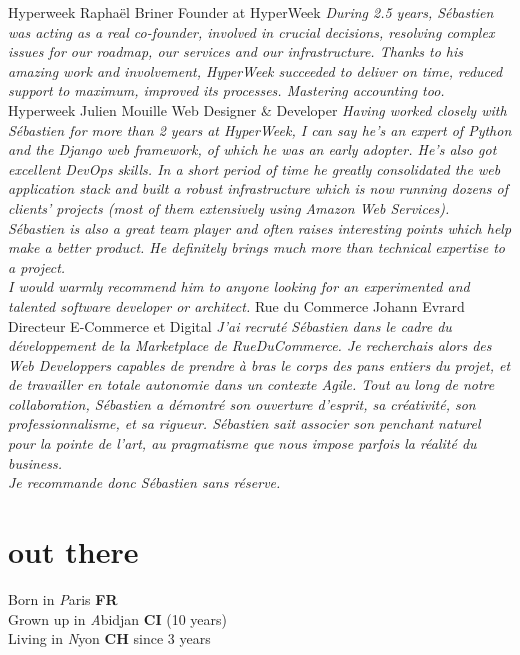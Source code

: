 \documentclass[]{friggeri}
\begin{document}
\begin{entrylist}
  \entry
    {Hyperweek}
    {Raphaël Briner}
    {Founder at HyperWeek}
    {\emph{During 2.5 years, Sébastien was acting as a real co-founder, involved in crucial decisions, resolving complex issues for our roadmap, our services and our infrastructure. Thanks to his amazing work and involvement, HyperWeek succeeded to deliver on time, reduced support to maximum, improved its processes. Mastering accounting too.}}
  \entry
    {Hyperweek}
    {Julien Mouille}
    {Web Designer \& Developer}
    {\emph{Having worked closely with Sébastien for more than 2 years at HyperWeek, I can say he's an expert of Python and the Django web framework, of which he was an early adopter. He's also got excellent DevOps skills. In a short period of time he greatly consolidated the web application stack and built a robust infrastructure which is now running dozens of clients' projects (most of them extensively using Amazon Web Services).\\
    Sébastien is also a great team player and often raises interesting points which help make a better product. He definitely brings much more than technical expertise to a project.\\
    I would warmly recommend him to anyone looking for an experimented and talented software developer or architect.}}
  \entry
    {Rue du Commerce}
    {Johann Evrard}
    {Directeur E-Commerce et Digital}
    {\emph{J'ai recruté Sébastien dans le cadre du développement de la Marketplace de RueDuCommerce. Je recherchais alors des Web Developpers capables de prendre à bras le corps des pans entiers du projet, et de travailler en totale autonomie dans un contexte Agile.
    Tout au long de notre collaboration, Sébastien a démontré son ouverture d'esprit, sa créativité, son professionnalisme, et sa rigueur. Sébastien sait associer son penchant naturel pour la pointe de l'art, au pragmatisme que nous impose parfois la réalité du business.\\
    Je recommande donc Sébastien sans réserve.}}
\end{entrylist}

\section{out there}

{\FA \faMapMarker} Born in {\emph Paris} {\bf FR}\\
{\FA \faPlane} Grown up in {\emph Abidjan} {\bf CI} (10 years)\\
{\FA \faPlane} Living in {\emph Nyon} {\bf CH} since 3 years
\end{document}
